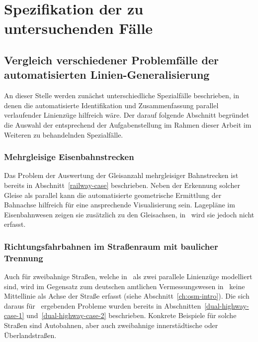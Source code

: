 \documentclass[../main/thesis.tex]{subfiles}
\begin{document}
\chapter{Spezifikation der zu untersuchenden Fälle}




\section[Vergleich verschiedener Fälle der automatisierten Linien-Generalisierung]{Vergleich verschiedener Problemfälle der au\-to\-ma\-ti\-sier\-ten Linien-Ge\-ne\-ra\-li\-sie\-rung}
\label{ch:case-comparison}

An dieser Stelle werden zunächst unterschiedliche Spezialfälle beschrieben, in denen die automatisierte Identifikation und Zusammenfassung parallel verlaufender Linienzüge hilfreich wäre.
Der darauf folgende Abschnitt begründet die Auswahl der entsprechend der Aufgabenstellung im Rahmen dieser Arbeit im Weiteren zu behandelnden Spezialfälle.



\subsection{Mehrgleisige Eisenbahnstrecken}

Das Problem der Auswertung der Gleisanzahl mehrgleisiger Bahnstrecken ist bereits in Abschnitt~\ref{railway-case} beschrieben.
Neben der Erkennung solcher Gleise als parallel kann die automatisierte geometrische Ermittlung der Bahnachse hilfreich für eine ansprechende Visualisierung sein.
Lagepläne im Eisenbahnwesen zeigen sie zusätzlich zu den Gleisachsen, in \osm\ wird sie jedoch nicht erfasst.




\subsection{Richtungsfahrbahnen im Straßenraum mit baulicher Trennung}
\label{ch:dual-highway-case-desc}

Auch für zweibahnige Straßen, welche in \osm\ als zwei parallele Linienzüge modelliert sind, wird im Gegensatz zum deutschen amtlichen Vermessungswesen in \osm\ keine Mittellinie als Achse der Straße erfasst (siehe Abschnitt~\ref{ch:osm-intro}).
Die sich daraus für \osm\ ergebenden Probleme wurden bereits in Abschnitten~\ref{dual-highway-case-1} und~\ref{dual-highway-case-2} beschrieben.
Konkrete Beispiele für solche Straßen sind Autobahnen, aber auch zweibahnige innerstädtische oder Überlandstraßen.
\end{document}
